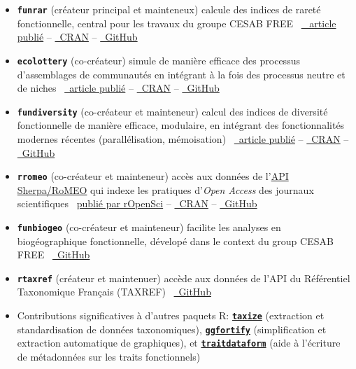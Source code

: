 \documentclass[10pt,a4paper,]{article}
\begin{document}
\begin{itemize}
\item
  \textbf{\texttt{funrar}} (créateur principal et mainteneux)
  \hfill\break calcule des indices de rareté fonctionnelle, central pour
  les travaux du groupe CESAB FREE
  \hfill\break ~\href{https://doi.org/10.1111/ddi.12629}{\faFile*~
  article publié} --
  \href{https://cran.r-project.org/package=funrar}{\faRProject~CRAN} --
  \href{https://github.com/Rekyt/funrar}{\faGithub~GitHub}
\item
  \textbf{\texttt{ecolottery}} (co-créateur) \hfill\break simule de
  manière efficace des processus d'assemblages de communautés en
  intégrant à la fois des processus neutre et de niches
  \hfill\break ~\href{https://doi.org/10.1111/2041-210X.12918}{\faFile*~article
  publié} --
  \href{https://cran.r-project.org/package=ecolottery}{\faRProject~CRAN}
  -- \href{https://github.com/frmunoz/ecolottery}{\faGithub~GitHub}
\item
  \textbf{\texttt{fundiversity}} (co-créateur et mainteneur)
  \hfill\break calcul des indices de diversité fonctionnelle de manière
  efficace, modulaire, en intégrant des fonctionnalités modernes
  récentes (parallélisation, mémoisation)
  \hfill\break ~\href{https://doi.org/10.1111/ecog.06585}{\faFile*~article
  publié} --
  \href{https://cran.r-project.org/package=fundiversity}{\faRProject~CRAN}
  -- \href{https://github.com/bisaloo/fundiversity}{\faGithub~GitHub}
\item
  \textbf{\texttt{rromeo}} (co-créateur et mainteneur)
  \hfill\break accès aux données de
  l'\href{https://v2.sherpa.ac.uk/romeo/}{API Sherpa/RoMEO} qui indexe
  les pratiques d'\textit{Open Access} des journaux scientifiques
  \hfill\break~\href{https://docs.ropensci.org/rromeo}{publié par
  rOpenSci} --
  \href{https://cran.r-project.org/package=rromeo}{\faRProject~CRAN} --
  \href{https://github.com/ropensci/rromeo}{\faGithub~GitHub}
\item
  \textbf{\texttt{funbiogeo}} (co-créateur et mainteneur)
  \hfill\break facilite les analyses en biogéographique fonctionnelle,
  dévelopé dans le context du group CESAB FREE
  \hfill\break ~\href{https://github.com/FRBCesab/funbiogeo}{\faGithub~GitHub}
\item
  \textbf{\texttt{rtaxref}} (créateur et maintenuer) \hfill\break accède
  aux données de l'API du Référentiel Taxonomique Français (TAXREF)
  \hfill\break ~\href{https://github.com/Rekyt/rtaxref}{\faGithub~GitHub}
\item
  Contributions significatives à d'autres paquets R:
  \href{https://cran.r-project.org/package=taxize}{\textbf{\texttt{taxize}}}
  (extraction et standardisation de données taxonomiques),
  \href{https://cran.r-project.org/package=ggfortify}{\textbf{\texttt{ggfortify}}}
  (simplification et extraction automatique de graphiques), et
  \href{https://cran.r-project.org/package=traitdataform}{\textbf{\texttt{traitdataform}}}
  (aide à l'écriture de métadonnées sur les traits fonctionnels)
\end{itemize}
\end{document}

